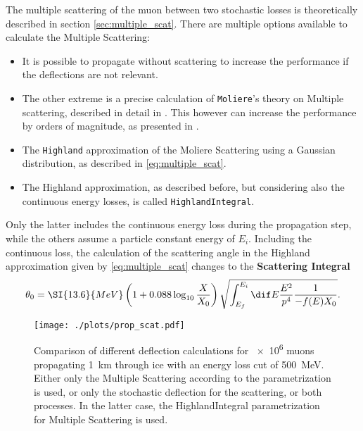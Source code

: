 The multiple scattering of the muon between two stochastic losses is theoretically described in section \ref{sec:multiple_scat}.
There are multiple options available to calculate the Multiple Scattering:
\begin{itemize}
    \item It is possible to propagate without scattering to increase the performance if the deflections are not relevant.
    \item The other extreme is a precise calculation of \texttt{Moliere}'s theory on Multiple scattering, described in detail in \cite{Geiselbrinck13Bachelor}.
    This however can increase the performance by orders of magnitude, as presented in \cite{Dunsch19PROPOSAL}.
    \item The \texttt{Highland} approximation of the Moliere Scattering using a Gaussian distribution, as described in \eqref{eq:multiple_scat}.
    \item The Highland approximation, as described before, but considering also the continuous energy losses, is called \texttt{HighlandIntegral}.
\end{itemize}
Only the latter includes the continuous energy loss during the propagation step, while the others assume a particle constant energy of $E_i$.
Including the continuous loss, the calculation of the scattering angle in the Highland approximation given by \eqref{eq:multiple_scat} changes to the \textbf{Scattering Integral}
\begin{align}
    \theta_0 = \SI{13.6}{MeV} \left( 1 + 0.088 \log_{10} \frac{X}{X_0} \right)
        \sqrt{ \int_{E_f}^{E_i} \dif E \frac{E^2}{p^4} \frac{1}{-f(E) X_0} } .
\end{align}
\begin{figure}
    \centering
    \texttt{[image: ./plots/prop\_scat.pdf]}
    \caption{Comparison of different deflection calculations for \num{e6} muons propagating \SI{1}{km} through ice with an energy loss cut of \SI{500}{MeV}. Either only the Multiple Scattering according to the parametrization is used, or only the stochastic deflection for the scattering, or both processes. In the latter case, the HighlandIntegral parametrization for Multiple Scattering is used.}
    \label{fig:prop_scat}
\end{figure}

